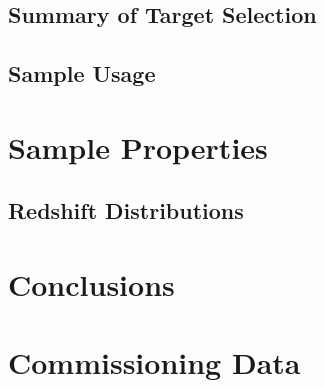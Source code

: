 \documentclass[iop,apj]{emulateapj}
\begin{document}
\subsection{Summary of Target Selection}

\subsection{Sample Usage}

\section{Sample Properties}

\subsection{Redshift Distributions}


\section{Conclusions}


\appendix

\section{Commissioning Data}
\end{document}
